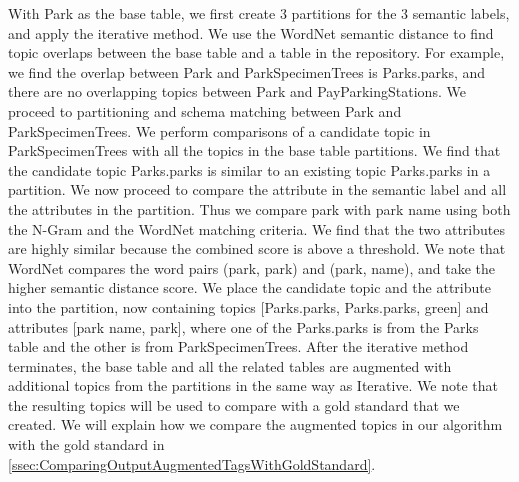 With Park as the base table, we first create 3 partitions for the 3 semantic labels, and apply the iterative method. We use the WordNet semantic distance to find topic overlaps between the base table and a table in the repository. For example, we find the overlap between Park and ParkSpecimenTrees is Parks.parks, and there are no overlapping topics between Park and PayParkingStations. We proceed to partitioning and schema matching between Park and ParkSpecimenTrees. We perform comparisons of a candidate topic in ParkSpecimenTrees with all the topics in the base table partitions. We find that the candidate topic Parks.parks is similar to an existing topic Parks.parks in a partition. We now proceed to compare the attribute in the semantic label and all the attributes in the partition. Thus we compare park with park name using both the N-Gram and the WordNet matching criteria. We find that the two attributes are highly similar because the combined score is above a threshold. We note that WordNet compares the word pairs (park, park) and (park, name), and take the higher semantic distance score. We place the candidate topic and the attribute into the partition, now containing topics [Parks.parks, Parks.parks, green] and attributes [park name, park], where one of the Parks.parks is from the Parks table and the other is from ParkSpecimenTrees.
After the iterative method terminates, the base table and all the related tables are augmented with additional topics from the partitions in the same way as Iterative. We note that the resulting topics will be used to compare with a gold standard that we created. We will explain how we compare the augmented topics in our algorithm with the gold standard in \autoref{ssec:ComparingOutputAugmentedTagsWithGoldStandard}.
